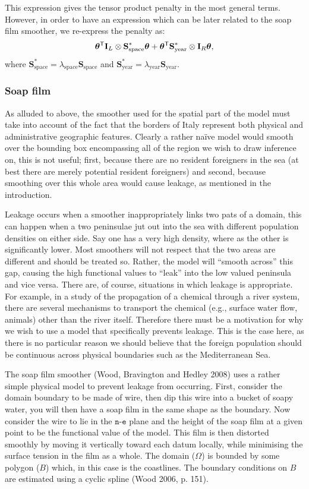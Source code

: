 \documentclass[10pt]{article}
\newcommand{\ts}{^{\sf T}}
\theoremstyle{definition}
\theoremstyle{plain}
\begin{document}
This expression gives the tensor product penalty in the most general terms. However, in order to have an expression which can be later related to the soap film smoother, we re-express the penalty as:
$$
\bm\theta\ts \textbf{I}_L \otimes \textbf{S}^*_\text{space} \bm\theta + \bm\theta\ts \textbf{S}^*_\text{year} \otimes \textbf{I}_R  \bm\theta,
$$
where $\textbf{S}^*_\text{space}=\lambda_\text{space} \textbf{S}_\text{space}$ and $\textbf{S}^*_\text{year}=\lambda_\text{year} \textbf{S}_\text{year}$.


\subsubsection{Soap film \label{SF}}

As alluded to above, the smoother used for the spatial part of the model must take into account of the fact that the borders of Italy represent both physical and administrative geographic features. Clearly a rather na\"ive model would smooth over the bounding box encompassing all of the region we wish to draw inference on, this is not useful; first, because there are no resident foreigners in the sea (at best there are merely potential resident foreigners) and second, because smoothing over this whole area would cause leakage, as mentioned in the introduction.

Leakage occurs when a smoother inappropriately links two pats of a domain, this can happen when a two peninsulae jut out into the sea with different population densities on either side. Say one has a very high density, where as the other is significantly lower. Most smoothers will not respect that the two areas are different and should be treated so. Rather, the model will ``smooth across'' this gap, causing the high functional values to ``leak'' into the low valued peninsula and vice versa. There are, of course, situations in which leakage is appropriate. For example, in a study of the propagation of a chemical through a river system, there are several mechanisms to transport the chemical (e.g., surface water flow, animals) other than the river itself. Therefore there must be a motivation for why we wish to use a model that specifically prevents leakage. This is the case here, as there is no particular reason we should believe that the foreign population should be continuous across physical boundaries such as the Mediterranean Sea.

The soap film smoother (Wood, Bravington and Hedley 2008) uses a rather simple physical model to prevent leakage from occurring. First, consider the domain boundary to be made of wire, then dip this wire into a bucket of soapy water, you will then have a soap film in the same shape as the boundary. Now consider the wire to lie in the $\texttt{n}$-$\texttt{e}$ plane and the height of the soap film at a given point to be the functional value of the model. This film is then distorted smoothly by moving it vertically toward each datum locally, while minimising the surface tension in the film as a whole. The domain ($\Omega$) is bounded by some polygon ($B$) which, in this case is the coastlines. The boundary conditions on $B$ are estimated using a cyclic spline (Wood 2006, p. 151).
\end{document}

